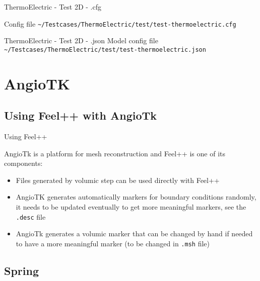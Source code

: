 \begin{frame}{ThermoElectric - Test 2D - .cfg}

Config file \lstinline{~/Testcases/ThermoElectric/test/test-thermoelectric.cfg}

\vspace{5mm}


\end{frame}


\begin{frame}{ThermoElectric - Test 2D - .json}
Model config file \lstinline{~/Testcases/ThermoElectric/test/test-thermoelectric.json}
\vspace{5mm}

\end{frame}

\section{AngioTK}
\subsection{Using Feel++ with AngioTk}
\begin{frame}{Using Feel++}

AngioTk is a platform for mesh reconstruction and Feel++ is one of its
components:
\begin{itemize}
\item Files generated by volumic step can be used directly with Feel++
\item AngioTK generates automatically markers for boundary conditions
  randomly, it needs to be updated eventually to get more meaningful
  markers, see the \texttt{.desc} file
\item AngioTk generates a volumic marker that can be changed by hand
  if needed to have a more meaningful marker (to be changed in
  \texttt{.msh} file)
\end{itemize}

\end{frame}
\subsection{Spring}

